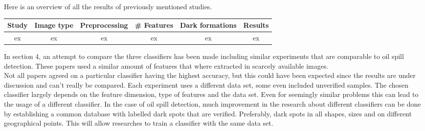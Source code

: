 \newpage
Here is an overview of all the results of previously mentioned studies.

\begin{table*}[t]
\centering
\begin{tabular}{*{6}{c}}
  Study & Image type & Preprocessing & \# Features & Dark formations & Results \\
    \hline
  ex & ex & ex & ex & ex & ex \\  
\end{tabular}
\end{table*}

In section 4, an attempt to compare the three classifiers has been made including similar experiments that are comparable to oil spill detection. These papers used a similar amount of features that where extracted in scarcely available images. \\ Not all papers agreed on a particular classifier having the highest accuracy, but this could have been expected since the results are under discussion and can't really be compared. Each experiment uses a different data set, some even included unverified samples. The chosen classifier largely depends on the feature dimension, type of features and the data set. Even for seemingly similar problems this can lead to the usage of a different classifier. In the case of oil spill detection, much improvement in the research about different classifiers can be done by establishing a common database with labelled dark spots that are verified. Preferably, dark spots in all shapes, sizes and on different geographical points. This will allow researches to train a classifier with the same data set.